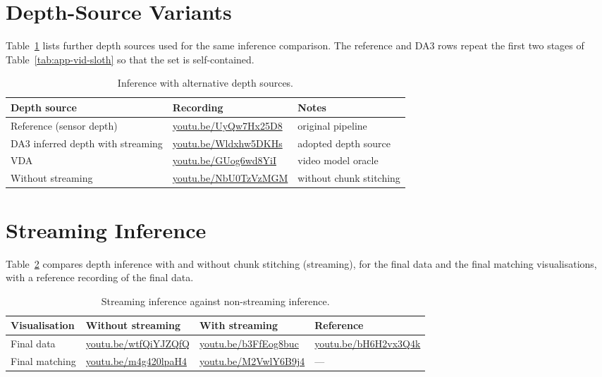 \section{Depth-Source Variants}
\label{sec:app-vid-depth-variants}

Table~\ref{tab:app-vid-variants} lists further depth sources used for the same inference
comparison. The reference and DA3 rows repeat the first two stages of
Table~\ref{tab:app-vid-sloth} so that the set is self-contained.

\begin{table}[H]
    \caption{Inference with alternative depth sources.}
    \label{tab:app-vid-variants}
    \begin{center}
        \small
        \begin{tabular}{@{}p{4.6cm}ll@{}} \toprule
            Depth source & Recording & Notes \\ \midrule
            Reference (sensor depth) & \url{youtu.be/UyQw7Hx25D8} & original pipeline \\
            DA3 inferred depth with streaming & \url{youtu.be/Wldxhw5DKHs} & adopted depth source \\
            VDA                      & \url{youtu.be/GUog6wd8YiI} & video model oracle \\
            Without streaming        & \url{youtu.be/NbU0TzVzMGM} & without chunk stitching \\ \bottomrule
        \end{tabular}
    \end{center}
\end{table}

\section{Streaming Inference}
\label{sec:app-vid-streaming}

Table~\ref{tab:app-vid-streaming} compares depth inference with and without chunk stitching
(streaming), for the final data and the final matching visualisations, with a reference recording
of the final data.

\begin{table}[H]
    \caption{Streaming inference against non-streaming inference.}
    \label{tab:app-vid-streaming}
    \begin{center}
        \small
        \begin{tabular}{@{}p{3.4cm}lll@{}} \toprule
            Visualisation & Without streaming & With streaming & Reference \\ \midrule
            Final data & \url{youtu.be/wtfQiYJZQfQ} & \url{youtu.be/b3FfEog8buc} & \url{youtu.be/bH6H2vx3Q4k} \\
            Final matching & \url{youtu.be/m4g420lpaH4} & \url{youtu.be/M2VwlY6B9j4} & --- \\ \bottomrule
        \end{tabular}
    \end{center}
\end{table}

